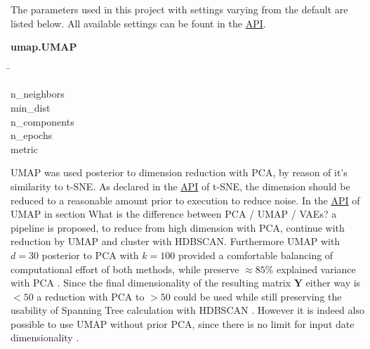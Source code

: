 The parameters used in this project with settings varying from the default are listed below. All available settings can be fount in the \href{https://umap-learn.readthedocs.io/en/latest/api.html}{API}.

\begin{leftbar}
    \textbf{umap.UMAP}
    \begin{nstabbing}
        \qquad\qquad\qquad\qquad\qquad\quad\=\kill

        n\_neighbors \\
        
        min\_dist \\
        
        n\_components \\
        
        n\_epochs \\
        
        metric 
    \end{nstabbing}
\end{leftbar}

\gls{UMAP} was used posterior to dimension reduction with \gls{PCA}, by reason of it's similarity to \gls{t-SNE}. As declared in the \href{https://scikit-learn.org/stable/modules/generated/sklearn.manifold.TSNE.html}{API} of \gls{t-SNE}, the dimension should be reduced to a reasonable amount prior to execution to reduce noise. In the \href{https://umap-learn.readthedocs.io/en/latest/api.html}{API} of \gls{UMAP} in section \glqq What is the difference between PCA / UMAP / VAEs?\grqq{} a pipeline is proposed, to reduce from high dimension with \gls{PCA}, continue with reduction by \gls{UMAP} and cluster with \gls{HDBSCAN}. Furthermore \gls{UMAP} with $d=30$ posterior to \gls{PCA} with $k=100$ provided a comfortable balancing of computational effort of both methods, while preserve $\approx 85\%$ explained variance with \gls{PCA} \autocite{mcinnes_umap_2020}. Since the final dimensionality of the resulting matrix $\mathbf{Y}$ either way is $<50$ a reduction with \gls{PCA} to $>50$ could be used while still preserving the usability of Spanning Tree calculation with \gls{HDBSCAN} \autocite{mcinnes_hdbscan_2017}. However it is indeed also possible to use \gls{UMAP} without prior \gls{PCA}, since there is no limit for input date dimensionality \autocite{mcinnes_umap_2020}. 